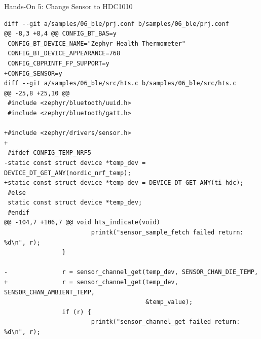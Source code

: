 \documentclass[10pt, aspectratio=169]{beamer}
\begin{document}
\begin{frame}[fragile]{Hands-On 5: Change Sensor to HDC1010}
  \begin{verbatim}
diff --git a/samples/06_ble/prj.conf b/samples/06_ble/prj.conf
@@ -8,3 +8,4 @@ CONFIG_BT_BAS=y
 CONFIG_BT_DEVICE_NAME="Zephyr Health Thermometer"
 CONFIG_BT_DEVICE_APPEARANCE=768
 CONFIG_CBPRINTF_FP_SUPPORT=y
+CONFIG_SENSOR=y
diff --git a/samples/06_ble/src/hts.c b/samples/06_ble/src/hts.c
@@ -25,8 +25,10 @@
 #include <zephyr/bluetooth/uuid.h>
 #include <zephyr/bluetooth/gatt.h>
 
+#include <zephyr/drivers/sensor.h>
+
 #ifdef CONFIG_TEMP_NRF5
-static const struct device *temp_dev = DEVICE_DT_GET_ANY(nordic_nrf_temp);
+static const struct device *temp_dev = DEVICE_DT_GET_ANY(ti_hdc);
 #else
 static const struct device *temp_dev;
 #endif
@@ -104,7 +106,7 @@ void hts_indicate(void)
                        printk("sensor_sample_fetch failed return: %d\n", r);
                }
 
-               r = sensor_channel_get(temp_dev, SENSOR_CHAN_DIE_TEMP,
+               r = sensor_channel_get(temp_dev, SENSOR_CHAN_AMBIENT_TEMP,
                                       &temp_value);
                if (r) {
                        printk("sensor_channel_get failed return: %d\n", r);
  \end{verbatim}
\end{frame}
\end{document}
